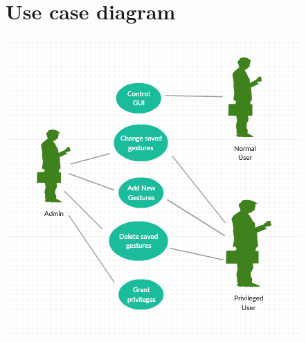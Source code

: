 \documentclass[11pt]{report}
\begin{document}
\section{Use case diagram}
\begin{center}
    \includegraphics{usecase.png}
\end{center}
\end{document}
